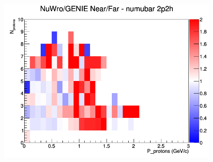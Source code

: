 \begin{figure}[h]
\endminipage
{}
\includegraphics[width=\linewidth]{N_P/nominal/protons/ratios/2p2h_NuWro_GENIE_numubar_NF_N_P.png}
\endminipage
\newline
\end{figure}
\clearpage
